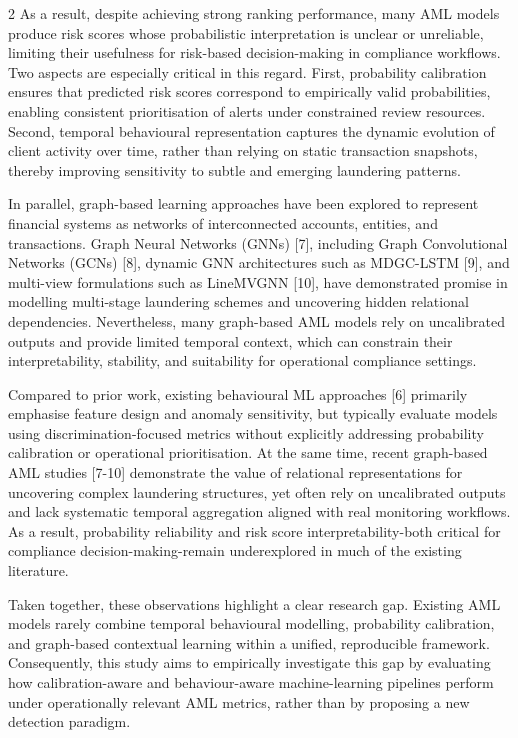 \begin{multicols}{2}
As a result, despite achieving strong ranking performance, many AML
models produce risk scores whose probabilistic interpretation is unclear
or unreliable, limiting their usefulness for risk-based decision-making
in compliance workflows. Two aspects are especially critical in this
regard. First, probability calibration ensures that predicted risk
scores correspond to empirically valid probabilities, enabling
consistent prioritisation of alerts under constrained review resources.
Second, temporal behavioural representation captures the dynamic
evolution of client activity over time, rather than relying on static
transaction snapshots, thereby improving sensitivity to subtle and
emerging laundering patterns.

In parallel, graph-based learning approaches have been explored to
represent financial systems as networks of interconnected accounts,
entities, and transactions. Graph Neural Networks (GNNs) {[}7{]},
including Graph Convolutional Networks (GCNs) {[}8{]}, dynamic GNN
architectures such as MDGC-LSTM {[}9{]}, and multi-view formulations
such as LineMVGNN {[}10{]}, have demonstrated promise in modelling
multi-stage laundering schemes and uncovering hidden relational
dependencies. Nevertheless, many graph-based AML models rely on
uncalibrated outputs and provide limited temporal context, which can
constrain their interpretability, stability, and suitability for
operational compliance settings.

Compared to prior work, existing behavioural ML approaches {[}6{]}
primarily emphasise feature design and anomaly sensitivity, but
typically evaluate models using discrimination-focused metrics without
explicitly addressing probability calibration or operational
prioritisation. At the same time, recent graph-based AML studies
{[}7-10{]} demonstrate the value of relational representations for
uncovering complex laundering structures, yet often rely on uncalibrated
outputs and lack systematic temporal aggregation aligned with real
monitoring workflows. As a result, probability reliability and risk
score interpretability-both critical for compliance
decision-making-remain underexplored in much of the existing literature.

Taken together, these observations highlight a clear research gap.
Existing AML models rarely combine temporal behavioural modelling,
probability calibration, and graph-based contextual learning within a
unified, reproducible framework. Consequently, this study aims to
empirically investigate this gap by evaluating how calibration-aware and
behaviour-aware machine-learning pipelines perform under operationally
relevant AML metrics, rather than by proposing a new detection paradigm.


\end{multicols}
